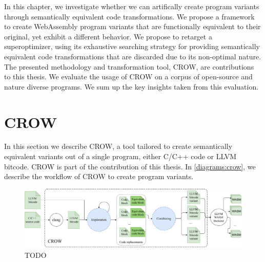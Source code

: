 





In this chapter, we investigate whether we can artifically create program variants through semantically equivalent code transformations. We propose a framework to create WebAssembly program variants that are functionally equivalent to their original, yet exhibit a different behavior.
We propose to retarget a superoptimizer, using its exhaustive searching strategy for providing semantically equivalent code transformations that are discarded due to its non-optimal nature.
The presented methodology and transformation tool, CROW, are contributions to this thesis.
We evaluate the usage of CROW on a corpus of open-source and nature diverse programs. 
We sum up the key insights taken from this evaluation.


\section{CROW}
\label{section:crow}
In this section we describe CROW, a tool tailored to create semantically equivalent variants out of a single program, either C/C++ code or LLVM bitcode. CROW is part of the contribution of this thesis.
In \autoref{diagrams:crow}, we describe the workflow of CROW to create program variants.

\begin{figure}[h]
    \includegraphics[width=\linewidth]{diagrams/generation/crow.drawio.pdf}
    \caption{TODO}
    \label{diagrams:crow}
\end{figure}

